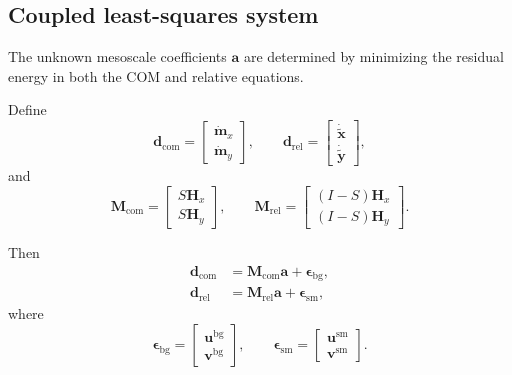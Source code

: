 \documentclass{article}
\begin{document}
\subsection{Coupled least-squares system}

The unknown mesoscale coefficients \(\mathbf a\) are determined by minimizing
the residual energy in both the COM and relative equations.

Define
\begin{equation}
\mathbf{d}_{\mathrm{com}}
=
\begin{bmatrix}
\dot{\mathbf{m}}_x\\
\dot{\mathbf{m}}_y
\end{bmatrix},
\qquad
\mathbf{d}_{\mathrm{rel}}
=
\begin{bmatrix}
\dot{\tilde{\mathbf{x}}}\\
\dot{\tilde{\mathbf{y}}}
\end{bmatrix},
\end{equation}
and
\begin{equation}
\mathbf{M}_{\mathrm{com}}
=
\begin{bmatrix}
S\mathbf{H}_x\\
S\mathbf{H}_y
\end{bmatrix},
\qquad
\mathbf{M}_{\mathrm{rel}}
=
\begin{bmatrix}
(I-S)\mathbf{H}_x\\
(I-S)\mathbf{H}_y
\end{bmatrix}.
\end{equation}

Then
\begin{align}
\mathbf{d}_{\mathrm{com}}
&=
\mathbf{M}_{\mathrm{com}}\mathbf{a}
+
\boldsymbol{\epsilon}_{\mathrm{bg}},
\label{eq:com_ls_system}
\\
\mathbf{d}_{\mathrm{rel}}
&=
\mathbf{M}_{\mathrm{rel}}\mathbf{a}
+
\boldsymbol{\epsilon}_{\mathrm{sm}},
\label{eq:rel_ls_system}
\end{align}
where
\begin{equation}
\boldsymbol{\epsilon}_{\mathrm{bg}}
=
\begin{bmatrix}
\mathbf{u}^{\mathrm{bg}}\\
\mathbf{v}^{\mathrm{bg}}
\end{bmatrix},
\qquad
\boldsymbol{\epsilon}_{\mathrm{sm}}
=
\begin{bmatrix}
\mathbf{u}^{\mathrm{sm}}\\
\mathbf{v}^{\mathrm{sm}}
\end{bmatrix}.
\end{equation}
\end{document}
